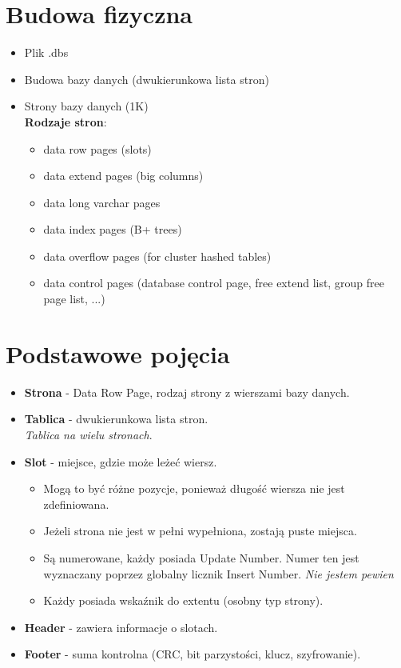 \documentclass[a4paper,twoside]{article}
\begin{document}
  	\section*{Budowa fizyczna}
  	\begin{itemize}
  		\item Plik .dbs
  		\item Budowa bazy danych (dwukierunkowa lista stron)
  		\item Strony bazy danych (1K)\\
  		\textbf{Rodzaje stron}:
  		\begin{itemize}
  			\item data row pages (slots)
  			\item data extend pages (big columns)
  			\item data long varchar pages
  			\item data index pages (B+ trees)
  			\item data overflow pages (for cluster hashed tables)
  			\item data control pages (database control page, free extend list, group free page list, ...)
  		\end{itemize}
  	\end{itemize}
  	
  	\section*{Podstawowe pojęcia}
  	\begin{itemize}
  		\item \textbf{Strona} - Data Row Page, rodzaj strony z wierszami bazy danych.
  		\item \textbf{Tablica} - dwukierunkowa lista stron.\\
  		\textit{Tablica na wielu stronach}.\\
  		
  		\item \textbf{Slot} - miejsce, gdzie może leżeć wiersz.
  		\begin{itemize}
  			\item Mogą to być różne pozycje, ponieważ długość wiersza nie jest zdefiniowana.
  			\item Jeżeli strona nie jest w pełni wypełniona, zostają puste miejsca.
  			\item Są numerowane, każdy posiada Update Number. Numer ten jest wyznaczany poprzez globalny licznik Insert Number. \emph{Nie jestem pewien}
  			\item Każdy posiada wskaźnik do extentu (osobny typ strony).
  		\end{itemize}
  		\item \textbf{Header} - zawiera informacje o slotach.
  		\item \textbf{Footer} - suma kontrolna (CRC, bit parzystości, klucz, szyfrowanie).
  	\end{itemize}
  	
\end{document}
